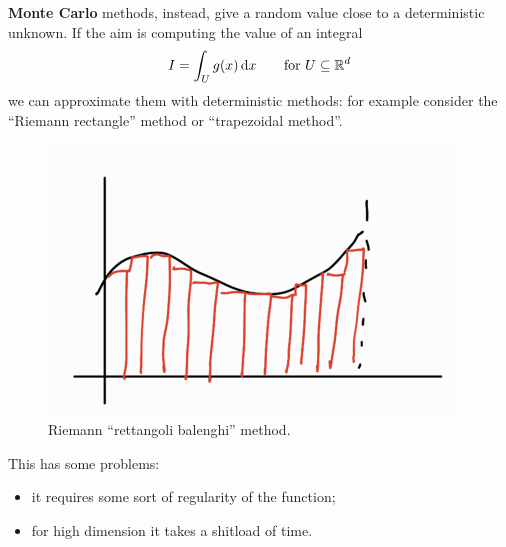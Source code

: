 \documentclass[12pt]{report}
\begin{document}
\textbf{\textcolor{OrangeRed2}{Monte Carlo}} methods, instead, give a random value close to a deterministic unknown. If the aim is computing the value of an integral
\begin{equation*}
	I=\int_{U}g(x)\mathop{}\!\mathrm{d} x\qquad\mathrm{for~}U\subseteq\mathbb{R}^{d}
\end{equation*}
we can approximate them with deterministic methods: for example consider the ``Riemann rectangle'' method or ``trapezoidal method''.
\begin{figure}[h]
	\centering
	\includegraphics[width=0.5\linewidth]{img/screenshot066}
	\caption{Riemann ``rettangoli balenghi'' method.}
	\label{fig:screenshot066}
\end{figure}
This has some problems:
\begin{itemize}
	\item it requires some sort of regularity of the function;
	\item for high dimension it takes a shitload of time.
\end{itemize}
\end{document}
